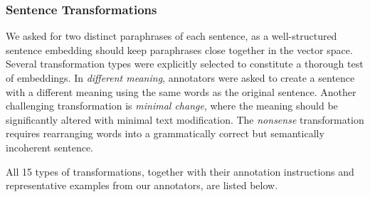\subsubsection{Sentence Transformations}
We asked for two distinct paraphrases of each sentence, as a well-structured sentence embedding should keep paraphrases close together in the vector space. Several transformation types were explicitly selected to constitute a thorough test of embeddings. In \textit{different meaning}, annotators were asked to create a sentence with a different meaning using the same words as the original sentence. Another challenging transformation is \textit{minimal change}, where the meaning should be significantly altered with minimal text modification. The \textit{nonsense} transformation requires rearranging words into a grammatically correct but semantically incoherent sentence. 

\noindent
All 15 types of transformations, together with their annotation instructions and representative examples from our annotators, are listed below.

